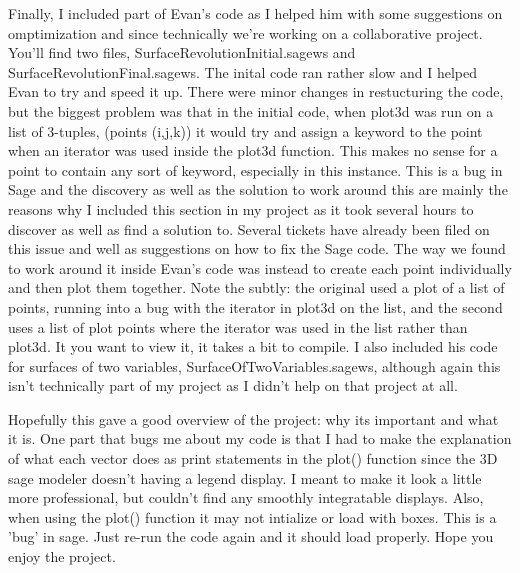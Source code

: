 \documentclass{article}
\begin{document}
Finally, I included part of Evan's code as I helped him with some suggestions on omptimization and since technically we're working on a collaborative project. You'll find two files, SurfaceRevolutionInitial.sagews and SurfaceRevolutionFinal.sagews. The inital code ran rather slow and I helped Evan to try and speed it up. There were minor changes in restucturing the code, but the biggest problem was that in the initial code, when plot3d was run on a list of 3-tuples, (points (i,j,k)) it would try and assign a keyword to the point when an iterator was used inside the plot3d function. This makes no sense for a point to contain any sort of keyword, especially in this instance. This is a bug in Sage and the discovery as well as the solution to work around this are mainly the reasons why I included this section in my project as it took several hours to discover as well as find a solution to. Several tickets have already been filed on this issue and well as suggestions on how to fix the Sage code. The way we found to work around it inside Evan's code was instead to create each point individually and then plot them together. Note the subtly: the original used a plot of a list of points, running into a bug with the iterator in plot3d on the list, and the second uses a list of plot points where the iterator was used in the list rather than plot3d. It you want to view it, it takes a bit to compile. I also included his code for surfaces of two variables, SurfaceOfTwoVariables.sagews, although again this isn't technically part of my project as I didn't help on that project at all.

Hopefully this gave a good overview of the project: why its important and what it is. One part that bugs me about my code is that I had to make the explanation of what each vector does as print statements in the plot() function since the 3D sage modeler doesn't having a legend display. I meant to make it look a little more professional, but couldn't find any smoothly integratable displays. Also, when using the plot() function it may not intialize or load with boxes. This is a 'bug' in sage. Just re-run the code again and it should load properly. Hope you enjoy the project.
\end{document}
